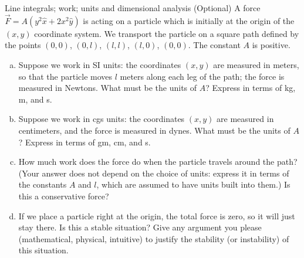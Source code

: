 \documentclass{esg8022pset}
\begin{document}
\begin{ForPSet}
  \addtocounter{section}{-1}
\end{ForPSet}

\begin{problem}{Line integrals; work; units and dimensional analysis (Optional)}
  A force ${\vec F} = A(y^2{\hat x} + 2x^2{\hat y})$ is acting on a
  particle which is initially at the origin of the $(x,y)$ coordinate
  system.  We transport the particle on a square path defined by the
  points $(0,0)$, $(0,l)$, $(l,l)$, $(l,0)$, $(0,0)$.  The constant $A$
  is positive.

  \begin{enumerate}[(a)]
    \item Suppose we work in SI units: the coordinates $(x,y)$ are measured
      in meters, so that the particle moves $l$ meters along each leg of the
      path; the force is measured in Newtons.  What must be the units of
      $A$?  Express in terms of kg, m, and s.
    \item Suppose we work in cgs units: the coordinates $(x,y)$ are measured
      in centimeters, and the force is measured in dynes.  What must be the
      units of $A$?  Express in terms of gm, cm, and s.
    \item How much work does the force do when the particle travels around
      the path?  (Your answer does not depend on the choice of units:
      express it in terms of the constants $A$ and $l$, which are assumed to
      have units built into them.)  Is this a conservative force?
    \item If we place a particle right at the origin, the total force is
      zero, so it will just stay there.  Is this a stable situation?  Give
      any argument you please (mathematical, physical, intuitive) to justify
      the stability (or instability) of this situation.
  \end{enumerate}
\end{problem}
\end{document}
